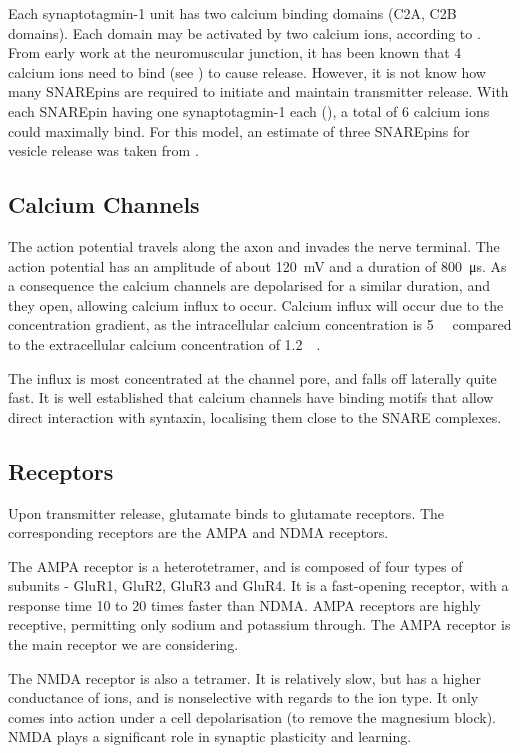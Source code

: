 \documentclass[a4paper]{article}
\begin{document}
Each synaptotagmin-1 unit has two calcium binding domains (C2A, C2B domains). Each domain may be activated by two calcium ions, according to \cite{Shao:Science:1996}. From early work at the neuromuscular junction, it has been known that 4 calcium ions need to bind (see \cite{Dodge:JPhysiol:1967}) to cause release. However, it is not know how many SNAREpins are required to initiate and maintain transmitter release. With each SNAREpin having one synaptotagmin-1 each (\cite{Wilhelm:Science:2014}), a total of 6 calcium ions could maximally bind. For this model, an estimate of three SNAREpins for vesicle release was taken from \cite{Dittrich:BiophysJ:2013}.

\subsection{Calcium Channels}
The action potential travels along the axon and invades the nerve terminal. The action potential has an amplitude of about \SI{120}{\milli\volt} and a duration of \SI{800}{\micro\second}. As a consequence the calcium channels are depolarised for a similar duration, and they open, allowing calcium influx to occur. Calcium influx will occur due to the concentration gradient, as the intracellular calcium concentration is \SI{5}{\nano\molar} compared to the extracellular calcium concentration of \SI{1.2}{\milli\molar}.

The influx is most concentrated at the channel pore, and falls off laterally quite fast. It is well established that calcium channels have binding motifs that allow direct interaction with syntaxin, localising them close to the SNARE complexes.

\subsection{Receptors}
Upon transmitter release, glutamate binds to glutamate receptors. The corresponding receptors are the AMPA and NDMA receptors. 

The AMPA receptor is a heterotetramer, and is composed of four types of subunits - GluR1, GluR2, GluR3 and GluR4. It is a fast-opening receptor, with a response time 10 to 20 times faster than NDMA. AMPA receptors are highly receptive, permitting only sodium and potassium through. The AMPA receptor is the main receptor we are considering.

The NMDA receptor is also a tetramer. It is relatively slow, but has a higher conductance of ions, and is nonselective with regards to the ion type. It only comes into action under a cell depolarisation (to remove the magnesium block). NMDA plays a significant role in synaptic plasticity and learning.
\end{document}
